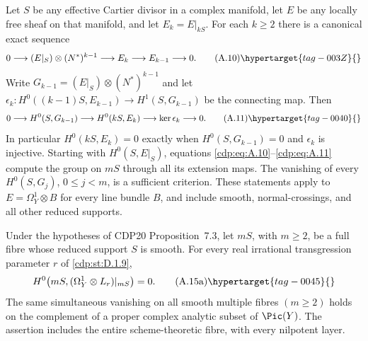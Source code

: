 \begin{proposition}\hypertarget{tag-01AL}{}\label{cdp:st:A.3.1}

Let $S$ be any effective Cartier divisor in a complex manifold, let $E$ be any locally free sheaf on that manifold, and let $E_k=E|_{kS}$. For each $k\ge2$ there is a canonical exact sequence
\[
0\longrightarrow (E|_S)\otimes(N^*)^{k-1}
 \longrightarrow E_k\longrightarrow E_{k-1}\longrightarrow0.
\tag{A.10}\hypertarget{tag-003Z}{}\label{cdp:eq:A.10}
\]
Write $G_{k-1}=(E|_S)\otimes(N^*)^{k-1}$ and let
$\epsilon_k:H^0((k-1)S,E_{k-1})\to H^1(S,G_{k-1})$
be the connecting map. Then
\[
0\longrightarrow H^0(S,G_{k-1})\longrightarrow H^0(kS,E_k)
 \longrightarrow\ker\epsilon_k\longrightarrow0.
\tag{A.11}\hypertarget{tag-0040}{}\label{cdp:eq:A.11}
\]
In particular $H^0(kS,E_k)=0$ exactly when $H^0(S,G_{k-1})=0$ and $\epsilon_k$ is injective. Starting with $H^0(S,E|_S)$, equations \eqref{cdp:eq:A.10}--\eqref{cdp:eq:A.11} compute the group on $mS$ through all its extension maps. The vanishing of every $H^0(S,G_j)$, $0\le j<m$, is a sufficient criterion. These statements apply to $E=\Omega_Y^1\otimes B$ for every line bundle $B$, and include smooth, normal-crossings, and all other reduced supports.
\end{proposition}

\begin{proposition}\hypertarget{tag-01AO}{}\label{cdp:st:A.3.4}

Under the hypotheses of CDP20 Proposition~7.3, let $mS$, with $m\ge2$, be a full fibre whose reduced support $S$ is smooth. For every real irrational transgression parameter $r$ of \ref{cdp:st:D.1.9},
\[
 H^0\bigl(mS,(\Omega_Y^1\otimes L_r)|_{mS}\bigr)=0.
 \tag{A.15a}\hypertarget{tag-0045}{}\label{cdp:eq:A.15a}
\]
The same simultaneous vanishing on all smooth multiple fibres $(m\ge2)$ holds on the complement of a proper complex analytic subset of $\Pic(Y)$. The assertion includes the entire scheme-theoretic fibre, with every nilpotent layer.
\end{proposition}

